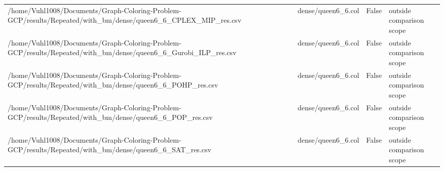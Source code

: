 \begin{table}[htbp]
\begin{tabular}{llll}
/home/Vuhl1008/Documents/Graph-Coloring-Problem-GCP/results/Repeated/with\_bm/dense/queen6\_6\_CPLEX\_MIP\_res.csv & dense/queen6\_6.col & False & outside comparison scope \\
/home/Vuhl1008/Documents/Graph-Coloring-Problem-GCP/results/Repeated/with\_bm/dense/queen6\_6\_Gurobi\_ILP\_res.csv & dense/queen6\_6.col & False & outside comparison scope \\
/home/Vuhl1008/Documents/Graph-Coloring-Problem-GCP/results/Repeated/with\_bm/dense/queen6\_6\_POHP\_res.csv & dense/queen6\_6.col & False & outside comparison scope \\
/home/Vuhl1008/Documents/Graph-Coloring-Problem-GCP/results/Repeated/with\_bm/dense/queen6\_6\_POP\_res.csv & dense/queen6\_6.col & False & outside comparison scope \\
/home/Vuhl1008/Documents/Graph-Coloring-Problem-GCP/results/Repeated/with\_bm/dense/queen6\_6\_SAT\_res.csv & dense/queen6\_6.col & False & outside comparison scope \\
\hline
\end{tabular}
\end{table}
